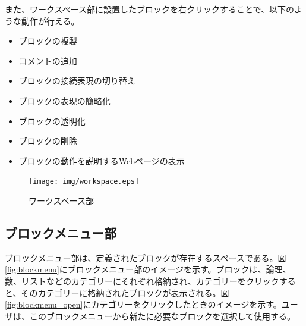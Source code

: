 \documentclass{risepaper}
\begin{document}
また、ワークスペース部に設置したブロックを右クリックすることで、以下のような動作が行える。

\begin{itemize}
\item ブロックの複製
\item コメントの追加
\item ブロックの接続表現の切り替え
\item ブロックの表現の簡略化
\item ブロックの透明化
\item ブロックの削除
\item ブロックの動作を説明するWebページの表示
\end{itemize} 
   
\begin{figure}[h]
\begin{center}
\texttt{[image: img/workspace.eps]}
\caption{ワークスペース部}%
\label{fig:workspace}
\end{center}%
\end{figure}%

   \subsection{ブロックメニュー部}
   
ブロックメニュー部は、定義されたブロックが存在するスペースである。図\ref{fig:blockmenu}にブロックメニュー部のイメージを示す。ブロックは、論理、数、リストなどのカテゴリーにそれぞれ格納され、カテゴリーをクリックすると、そのカテゴリーに格納されたブロックが表示される。図\ref{fig:blockmenu_open}にカテゴリーをクリックしたときのイメージを示す。ユーザは、このブロックメニューから新たに必要なブロックを選択して使用する。
\end{document}
